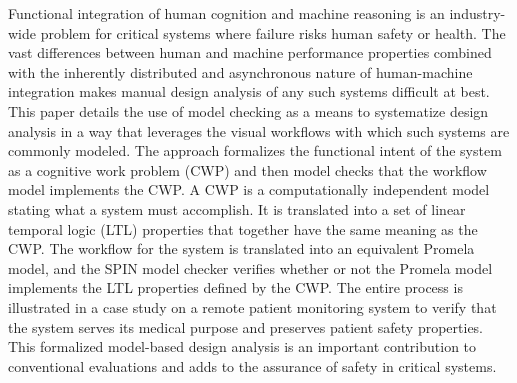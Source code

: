 Functional integration of human cognition and machine reasoning is an industry-wide problem for critical systems where failure risks human safety or health. The vast differences between human and machine performance properties combined with the inherently distributed and asynchronous nature of human-machine integration makes manual design analysis of any such systems difficult at best. This paper details the use of model checking as a means to systematize design analysis in a way that leverages the visual workflows with which such systems are commonly modeled. The approach formalizes the functional intent of the system as a cognitive work problem (CWP) and then model checks that the workflow model implements the CWP. A CWP is a computationally independent model stating what a system must accomplish. It is translated into a set of linear temporal logic (LTL) properties that together have the same meaning as the CWP. The workflow for the system is translated into an equivalent Promela model, and the SPIN model checker verifies whether or not the Promela model implements the LTL properties defined by the CWP. The entire process is illustrated in a case study on a remote patient monitoring system to verify that the system serves its medical purpose and preserves patient safety properties.  This formalized model-based design analysis is an important contribution to conventional evaluations and adds to the assurance of safety in critical systems.

\begin{comment}
Remote health-care that integrates human and machine intelligence for patient monitoring is an active area of research. These systems must take extra precautions for safety since the patients are not in the direct supervision of medical providers. This paper details the application of model checking to the Bionous \phware\ remote patient monitoring system to prove it preserves patient safety properties. Patient safety requirements are formalized in a cognitive work problem that is translated to Linear Temporal Logic properties. A cognitive work problem (CWP) is a computationally independent model stating what a system must accomplish. In this example, the system must take action on risk awareness to enhance patient safety, so the CWP defines risk awareness and requisite decisions given the current risk. The \phware\ workflow is translated to Promela to model the asynchronous behaviors of the patient at home, the artificial intelligence in the cloud, and the clinicians. The LTL and Promela models with added behaviors for patient severity are given to the SPIN model checker to prove the system implements the cognitive work problem, meaning it acts appropriately in regards to risk awareness. This result is an important contribution to conventional evaluations and contributes to the assurance of patient safety in remote health IT.
\end{comment}